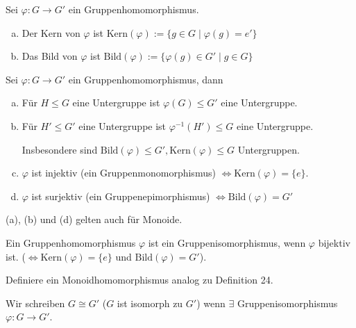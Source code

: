 \documentclass[a4paper]{report}
\begin{document}
\begin{defi}
  Sei $\varphi : G \to G'$ ein Gruppenhomomorphismus.
  \begin{enumerate}[(a)]
    \item Der Kern von $\varphi$ ist $\mathrm{Kern}(\varphi) := \{g \in G \mid \varphi(g) = e'\}$
    \item Das Bild von $\varphi$ ist $\mathrm{Bild}(\varphi) := \{\varphi(g) \in G'\mid g \in G\}$
  \end{enumerate}
\end{defi}

\begin{prop}[Übung]
  Sei $\varphi : G \to G'$ ein Gruppenhomomorphismus, dann
  \begin{enumerate}[(a)]
          \item Für $H \le G$ eine Untergruppe ist $\varphi(G) \le G'$ eine Untergruppe.
    \item Für $H' \le G'$ eine Untergruppe ist $\varphi^{-1}(H') \le G$ eine Untergruppe.

          Insbesondere sind $\mathrm{Bild}(\varphi) \le G', \mathrm{Kern}(\varphi) \le G$ Untergruppen.
    \item $\varphi$ ist injektiv (ein Gruppenmonomorphismus) $\iff \mathrm{Kern}(\varphi) = \{e\}$.
    \item $\varphi$ ist surjektiv (ein Gruppenepimorphismus) $\iff \mathrm{Bild}(\varphi) = G'$
  \end{enumerate}
  \begin{bem*}
(a), (b) und (d) gelten auch für Monoide.
  \end{bem*}
\end{prop}

\begin{defi}
Ein Gruppenhomomorphismus $\varphi$ ist ein Gruppenisomorphismus, wenn $\varphi$ bijektiv ist. ($\iff \mathrm{Kern}(\varphi) = \{e\}$ und $\mathrm{Bild}(\varphi) =G'$).
\end{defi}
\begin{bem*}[Übung]
  Definiere ein Monoidhomomorphismus analog zu Definition 24.
\end{bem*}

\begin{nota*}
  Wir schreiben $G \cong G'$ ($G$ ist isomorph zu $G'$) wenn $\exists$ Gruppenisomorphismus $\varphi : G \to G'$.
\end{nota*}
\end{document}
